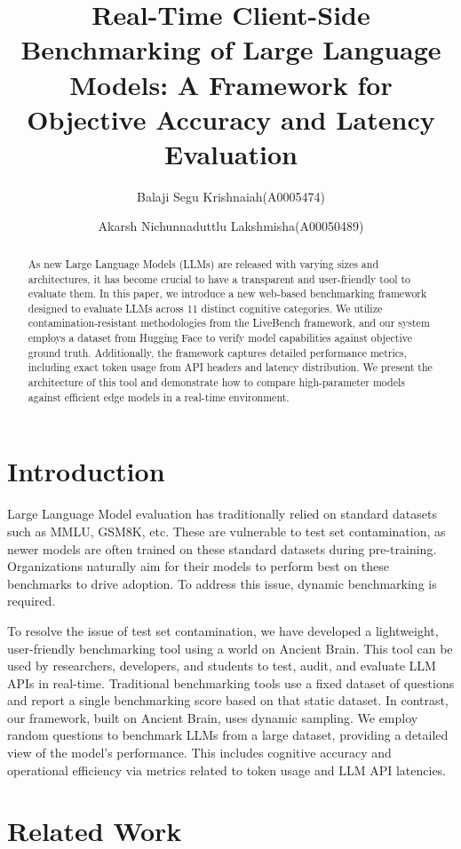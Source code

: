 \documentclass[10pt, twocolumn, a4paper]{article}
\title{\textbf{Real-Time Client-Side Benchmarking of Large Language Models: A Framework for Objective Accuracy and Latency Evaluation}}
\author{Balaji Segu Krishnaiah(A0005474)}
\author{Akarsh Nichunnaduttlu Lakshmisha(A00050489)}
\affil{Dublin City University}
\date{} %
\begin{document}
\maketitle

\begin{abstract}
As new Large Language Models (LLMs) are released with varying sizes and architectures, it has become crucial to have a transparent and user-friendly tool to evaluate them. In this paper, we introduce a new web-based benchmarking framework designed to evaluate LLMs across 11 distinct cognitive categories. We utilize contamination-resistant methodologies from the LiveBench framework, and our system employs a dataset from Hugging Face to verify model capabilities against objective ground truth. Additionally, the framework captures detailed performance metrics, including exact token usage from API headers and latency distribution. We present the architecture of this tool and demonstrate how to compare high-parameter models against efficient edge models in a real-time environment.
\end{abstract}

\section{Introduction}
Large Language Model evaluation has traditionally relied on standard datasets such as MMLU, GSM8K, etc. These are vulnerable to test set contamination, as newer models are often trained on these standard datasets during pre-training. Organizations naturally aim for their models to perform best on these benchmarks to drive adoption. To address this issue, dynamic benchmarking is required.

To resolve the issue of test set contamination, we have developed a lightweight, user-friendly benchmarking tool using a world on Ancient Brain. This tool can be used by researchers, developers, and students to test, audit, and evaluate LLM APIs in real-time. Traditional benchmarking tools use a fixed dataset of questions and report a single benchmarking score based on that static dataset. In contrast, our framework, built on Ancient Brain, uses dynamic sampling. We employ random questions to benchmark LLMs from a large dataset, providing a detailed view of the model’s performance. This includes cognitive accuracy and operational efficiency via metrics related to token usage and LLM API latencies.
\section{Related Work}
\end{document}
